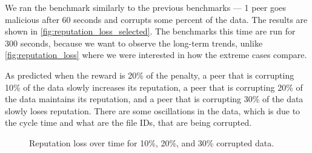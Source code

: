 We ran the benchmark similarly to the previous benchmarks --- 
1 peer goes malicious after 60 seconds and corrupts some percent of the data.
The results are shown in \autoref{fig:reputation_loss_selected}.
The benchmarks this time are run for 300 seconds, because we want to observe the long-term trends,
unlike \autoref{fig:reputation_loss} where we were interested in how the extreme cases compare.

As predicted when the reward is 20\% of the penalty, a peer that is corrupting 10\% of the data
slowly increases its reputation, a peer that is corrupting 20\% of the data maintains its reputation,
and a peer that is corrupting 30\% of the data slowly loses reputation.
There are some oscillations in the data, which is due to the cycle time and what are the file IDs,
that are being corrupted.

\begin{figure}
  \centering
  \caption{Reputation loss over time for 10\%, 20\%, and 30\% corrupted data.}
  \label{fig:reputation_loss_selected}
\end{figure}

